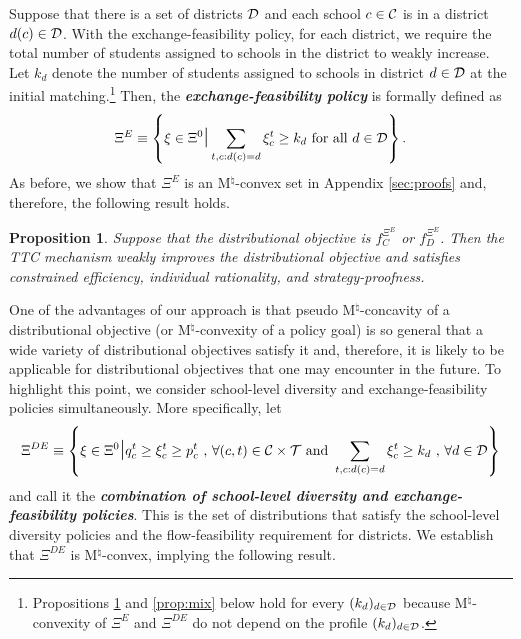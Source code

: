 \documentclass[12pt]{amsart}
\newtheorem{proposition}{Proposition}
\theoremstyle{remark}
\newcommand{\df}[1]{\textbf{\textit{#1}}}
\newcommand{\ieh}[1]{{\color{orange} IEH: #1 }}
\newcommand{\fk}[1]{{\color{red} FK: #1 }}
\begin{document}
Suppose that there is a set of districts $\mathcal{D}$ and each school $c\in \mathcal{C}$ is in a district $d(c)\in \mathcal{D}$.
With the exchange-feasibility policy, for each district, we require the total number of
students assigned to schools in the district to weakly increase. Let $k_{d}$ denote
the number of students assigned to schools in district $d\in \mathcal{D}$ at
the initial matching.\footnote{Propositions \ref{prop:convexbal} and \ref{prop:mix} below hold for every $(k_d)_{d\in \mathcal{D}}$ because M$^{\natural}$-convexity
of $\Xi^E$ and $\Xi^{DE}$ do not depend on the profile $(k_d)_{d\in \mathcal{D}}$.} Then, the \df{exchange-feasibility policy} is formally defined as
\[\Xi^E \equiv \left \{\xi \in \Xi^0 \mathlarger{\mathlarger{\mid}} \sum_{t,c:d(c)=d} \xi_c^t \geq k_{d} \text{ for all } d \in \cald \right \}.\]
As before, we show that $\Xi^E$ is an M$^{\natural}$-convex set in Appendix \ref{sec:proofs} and, therefore, the following result holds.
\begin{proposition}\label{prop:convexbal}
Suppose that the distributional objective is $f_C^{\Xi^E}$ or $f_D^{\Xi^E}$. Then the TTC mechanism weakly improves the distributional objective and satisfies constrained efficiency, individual rationality, and strategy-proofness.
\end{proposition}

One of the advantages of our approach is that pseudo M$^ {\natural}$-concavity of a distributional objective (or M$^{\natural}$-convexity of a policy goal)
is so general that a wide variety of distributional objectives satisfy it and, therefore, it is likely to be applicable for distributional objectives that one may
encounter in the future. To highlight this point, we consider school-level diversity %
and exchange-feasibility policies simultaneously. More specifically, let
\[\Xi^{DE} \equiv \left\{\xi \in \Xi^0 \mathlarger{\mathlarger{\mid}} q_c^t \geq \xi_c^t \geq p_c^t \mbox{ , } \forall (c,t)\in \calc \times \calt \mbox{ and }  \sum_{t,c:d(c) = d} \xi_c^t \geq k_{d} \text{ , } \forall d \in \cald \right\}\]
and call it the \df{combination of school-level diversity and exchange-feasibility policies}.
This is the set of distributions that satisfy the school-level diversity policies and the flow-feasibility requirement for districts. We
establish that $\Xi^{DE}$ is M$^{\natural}$-convex, implying the following result.
\end{document}

